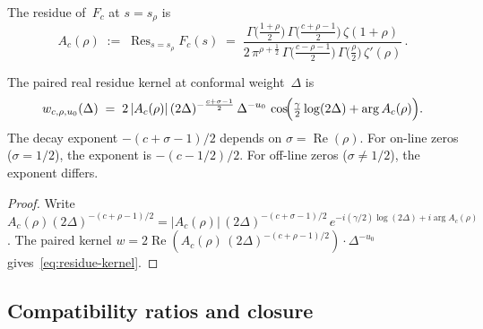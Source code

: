 \begin{definition}%
\label{def:universal-residue-factor}%
%
The residue of~$F_c$ at $s = s_\rho$ is
\begin{equation}\label{eq:universal-residue}
A_c(\rho)
\;:=\;
\operatorname{Res}_{s=s_\rho}F_c(s)
\;=\;
\frac{\Gamma\!\bigl(\tfrac{1+\rho}{2}\bigr)\,
\Gamma\!\bigl(\tfrac{c+\rho-1}{2}\bigr)\,
\zeta(1{+}\rho)}
{2\,\pi^{\rho+\frac{1}{2}}\,
\Gamma\!\bigl(\tfrac{c-\rho-1}{2}\bigr)\,
\Gamma\!\bigl(\tfrac{\rho}{2}\bigr)\,
\zeta'(\rho)}\,.
\end{equation}
\end{definition}

\begin{proposition}[\ClaimStatusProvedHere]%
\label{prop:on-off-line-distinction}%
%
The paired real residue kernel at conformal
weight~$\Delta$ is
\begin{equation}\label{eq:residue-kernel}
w_{c,\rho,u_0}(\Delta)
\;=\;
2\,|A_c(\rho)|\,(2\Delta)^{-\frac{c+\sigma-1}{2}}\,
\Delta^{-u_0}\,
\cos\!\Bigl(
\tfrac{\gamma}{2}\log(2\Delta) + \arg A_c(\rho)
\Bigr).
\end{equation}
The decay exponent $-(c{+}\sigma{-}1)/2$ depends on
$\sigma = \operatorname{Re}(\rho)$.
For on-line zeros ($\sigma = 1/2$), the exponent
is $-(c{-}1/2)/2$.
For off-line zeros ($\sigma \neq 1/2$), the exponent differs.
\end{proposition}

\begin{proof}
Write $A_c(\rho)(2\Delta)^{-(c+\rho-1)/2}
= |A_c(\rho)|\,(2\Delta)^{-(c+\sigma-1)/2}\,
e^{-i(\gamma/2)\log(2\Delta) + i\arg A_c(\rho)}$.
The paired kernel
$w = 2\operatorname{Re}(A_c(\rho)\,(2\Delta)^{-(c+\rho-1)/2})
\cdot \Delta^{-u_0}$
gives~\eqref{eq:residue-kernel}.
\end{proof}

\subsection{Compatibility ratios and closure}%
\label{sec:clutching-closure-theory}%


